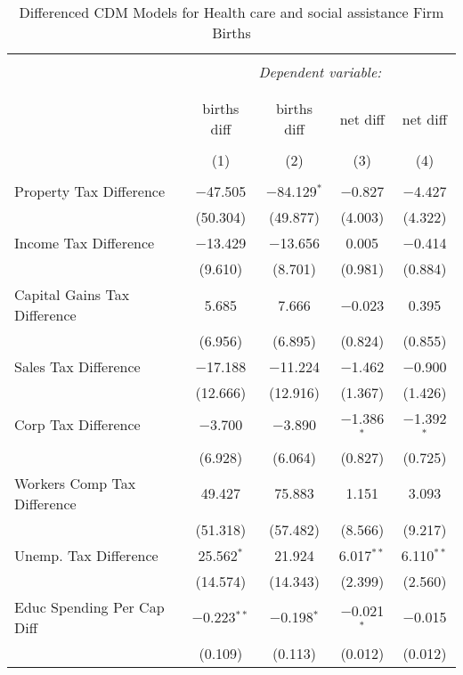 
\begin{table}[!htbp] \centering 
  \caption{Differenced CDM Models for  Health care and social assistance Firm Births} 
  \label{} 
\begin{tabular}{@{\extracolsep{5pt}}lcccc} 
\\[-1.8ex]\hline 
\hline \\[-1.8ex] 
 & \multicolumn{4}{c}{\textit{Dependent variable:}} \\ 
\cline{2-5} 
\\[-1.8ex] & \multicolumn{4}{c}{ } \\ 
 & births diff & births diff & net diff & net diff \\ 
\\[-1.8ex] & (1) & (2) & (3) & (4)\\ 
\hline \\[-1.8ex] 
 Property Tax Difference & $-$47.505 & $-$84.129$^{*}$ & $-$0.827 & $-$4.427 \\ 
  & (50.304) & (49.877) & (4.003) & (4.322) \\ 
  Income Tax Difference & $-$13.429 & $-$13.656 & 0.005 & $-$0.414 \\ 
  & (9.610) & (8.701) & (0.981) & (0.884) \\ 
  Capital Gains Tax Difference & 5.685 & 7.666 & $-$0.023 & 0.395 \\ 
  & (6.956) & (6.895) & (0.824) & (0.855) \\ 
  Sales Tax Difference & $-$17.188 & $-$11.224 & $-$1.462 & $-$0.900 \\ 
  & (12.666) & (12.916) & (1.367) & (1.426) \\ 
  Corp Tax Difference & $-$3.700 & $-$3.890 & $-$1.386$^{*}$ & $-$1.392$^{*}$ \\ 
  & (6.928) & (6.064) & (0.827) & (0.725) \\ 
  Workers Comp Tax Difference & 49.427 & 75.883 & 1.151 & 3.093 \\ 
  & (51.318) & (57.482) & (8.566) & (9.217) \\ 
  Unemp. Tax Difference & 25.562$^{*}$ & 21.924 & 6.017$^{**}$ & 6.110$^{**}$ \\ 
  & (14.574) & (14.343) & (2.399) & (2.560) \\ 
  Educ Spending Per Cap Diff & $-$0.223$^{**}$ & $-$0.198$^{*}$ & $-$0.021$^{*}$ & $-$0.015 \\ 
  & (0.109) & (0.113) & (0.012) & (0.012) \\ 

\end{tabular}
\end{table}
